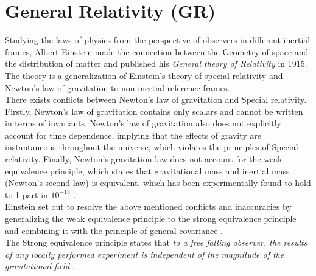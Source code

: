 \documentclass[a4paper, 11pt]{FSKH_623_Report}
\numberwithin{equation}{section}
\begin{document}
\section{General Relativity (GR)}
Studying the laws of physics from the perspective of observers in different inertial frames, Albert Einstein made the connection between the Geometry of space and the distribution of matter \citep{ITC} and published his \textit{General theory of Relativity} in 1915. The theory is a generalization of Einstein's theory of special relativity and Newton's law of gravitation to non-inertial reference frames.\\
There exists conflicts between Newton's law of gravitation and Special relativity. Firstly, Newton's law of gravitation contains only scalars and cannot be written in terms of invariants. Newton's law of gravitation also does not explicitly account for time dependence, implying that the effects of gravity are instantaneous throughout the universe, which violates the principles of Special relativity. Finally, Newton's gravitation law does not account for the weak equivalence principle, which states that gravitational mass and inertial mass (Newton's second law) is equivalent, which has been experimentally found to hold to 1 part in $10^{-13}$ \citep{EP}. \\
Einstein set out to resolve the above mentioned conflicts and inaccuracies by generalizing the weak equivalence principle to the strong equivalence principle and combining it with the principle of general covariance \citep{ITC}. \\
The Strong equivalence principle states that \textit{to a free falling observer, the results of any locally performed experiment is independent of the magnitude of the gravitational field} \citep{ITC, GRFD}.  \\
\end{document}
